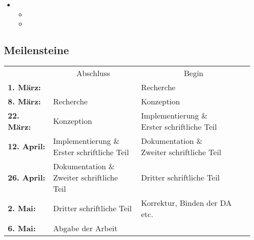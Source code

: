 \begin{itemize}
\begin{itemize}
\begin{itemize}
            \item {}
            \item {}
          \end{itemize}
        \item {}
          \begin{itemize}
            \item {}
            \item {}
          \end{itemize}
      \end{itemize}
  \end{itemize}

  \subsection{Meilensteine}
  \label{ssec:meilensteine}
    \begin{table}[H]
      \begin{tabularx}{\textwidth}{lXX}
        {}
          & \multicolumn{1}{c}{Abschluss}
            & \multicolumn{1}{c}{Begin}\\
        \cline{2-3}
        \textbf{1. März:}
          & {}
            & Recherche\\
        \textbf{8. März:}
          & Recherche
            & Konzeption\\
        \textbf{22. März:}
          & Konzeption
            & \specialcell[t]{Implementierung \&\\Erster schriftliche Teil}\\
        \textbf{12. April:}
          & \specialcell[t]{Implementierung \&\\Erster schriftliche Teil}
            & \specialcell[t]{Dokumentation \&\\Zweiter schriftliche Teil}\\
        \textbf{26. April:}
          & \specialcell[t]{Dokumentation \&\\Zweiter schriftliche Teil}
            & Dritter schriftliche Teil\\
        \textbf{2. Mai:}
          & Dritter schriftliche Teil
            & Korrektur, Binden der DA etc.\\
        \textbf{6. Mai:}
          & Abgabe der Arbeit
            &\\
      \end{tabularx}
    \end{table}

